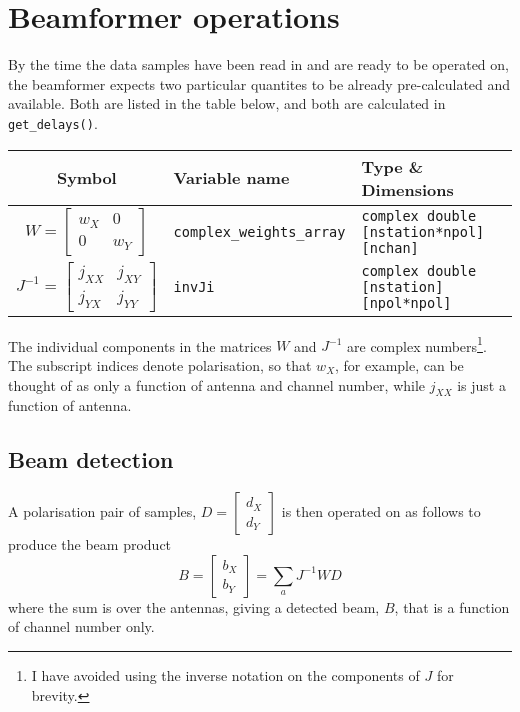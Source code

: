 \documentclass{article}
\begin{document}
\section{Beamformer operations}

By the time the data samples have been read in and are ready to be operated on, the beamformer expects two particular quantites to be already pre-calculated and available.
Both are listed in the table below, and both are calculated in \texttt{get\_delays()}.
\begin{table}[!h]
    \centering
    \begin{tabular}{c|l|l}
        Symbol & Variable name & Type \& Dimensions \\[5pt]
        \hline
        $W = \begin{bmatrix} w_X & 0 \\ 0 & w_Y \end{bmatrix}$ & \texttt{complex\_weights\_array} & \texttt{complex double [nstation*npol][nchan]} \\[12pt]
        $J^{-1} = \begin{bmatrix} j_{XX} & j_{XY} \\ j_{YX} & j_{YY} \end{bmatrix}$ & \texttt{invJi} & \texttt{complex double [nstation][npol*npol]}
    \end{tabular}
\end{table}
The individual components in the matrices $W$ and $J^{-1}$ are complex numbers\footnote{I have avoided using the inverse notation on the components of $J$ for brevity.}. The subscript indices denote polarisation, so that $w_X$, for example, can be thought of as only a function of antenna and channel number, while $j_{XX}$ is just a function of antenna.

\subsection{Beam detection}
A polarisation pair of samples, $D = \begin{bmatrix} d_X \\ d_Y \end{bmatrix}$ is then operated on as follows to produce the beam product
\begin{equation}
    B = \begin{bmatrix} b_X \\ b_Y \end{bmatrix} = \sum_a J^{-1}WD
\end{equation}
where the sum is over the antennas, giving a detected beam, $B$, that is a function of channel number only.
\end{document}
